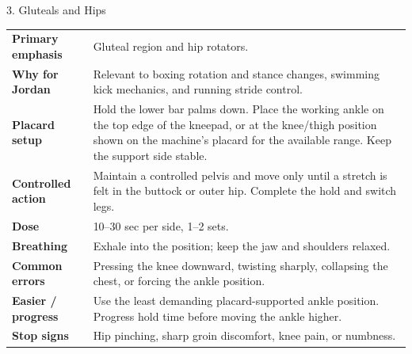 \documentclass[10pt,letterpaper]{article}
\begin{document}
\begin{stretchbox}{3. Gluteals and Hips}
\begin{tabularx}{\textwidth}{@{}L{1.28in}Y@{}}
\textbf{Primary emphasis} & Gluteal region and hip rotators. \\
\textbf{Why for Jordan} & Relevant to boxing rotation and stance changes, swimming kick mechanics, and running stride control. \\
\textbf{Placard setup} & Hold the lower bar palms down. Place the working ankle on the top edge of the kneepad, or at the knee/thigh position shown on the machine's placard for the available range. Keep the support side stable. \\
\textbf{Controlled action} & Maintain a controlled pelvis and move only until a stretch is felt in the buttock or outer hip. Complete the hold and switch legs. \\
\textbf{Dose} & 10--30 sec per side, 1--2 sets. \\
\textbf{Breathing} & Exhale into the position; keep the jaw and shoulders relaxed. \\
\textbf{Common errors} & Pressing the knee downward, twisting sharply, collapsing the chest, or forcing the ankle position. \\
\textbf{Easier / progress} & Use the least demanding placard-supported ankle position. Progress hold time before moving the ankle higher. \\
\textbf{Stop signs} & Hip pinching, sharp groin discomfort, knee pain, or numbness. \\
\end{tabularx}
\end{stretchbox}
\end{document}
